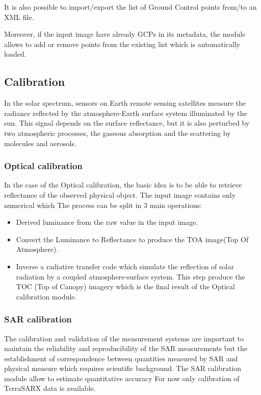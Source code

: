 It is also possible to import/export the list of Ground Control points
from/to an XML file.

Moreover, if the input image have already GCPs in its metadata, the
module allows to add or remove points from the existing list which is
automatically loaded.

\subsection{Calibration}
In the solar spectrum, sensors on Earth remote sensing satellites
measure the radiance reflected by the atmosphere-Earth surface system
illuminated by the sun. This signal depends on the surface
reflectance, but it is also perturbed by two atmospheric processes,
the gaseous absorption and the scattering by molecules and aerosols.


\subsubsection{Optical calibration}
In the case of the Optical calibration, the basic idea is to be able
to retrieve reflectance of the observed physical object.  The input
image contains only numerical which The process can be split in 3 main
operations:
\begin{itemize}
\item Derived luminance from the raw value in the input image. 
\item Convert the Luminance to Reflectance to produce the TOA
  image(Top Of Atmosphere).
\item Inverse a radiative transfer code which simulate the reflection
  of solar radiation by a coupled atmosphere-surface system. This step
  produce the TOC (Top of Canopy) imagery which is the final result of
  the Optical calibration module.
\end{itemize}


\subsubsection{SAR calibration}

The calibration and validation of the measurement systems are
important to maintain the reliability and reproducibility of the SAR
measurements but the establishment of correspondence between
quantities measured by SAR and physical measure which requires
scientific background. The SAR calibration module allow to estimate
quantitative accuracy For now only calibration of TerraSARX data is
available.

